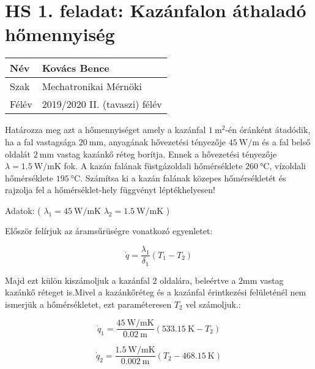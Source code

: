 
\section*{HS 1. feladat: Kazánfalon áthaladó hőmennyiség}


\begin{tabular}{ | p{2cm} | p{14cm} | } 
	\hline
	Név & Kovács Bence \\ 
	\hline
	Szak &  Mechatronikai Mérnöki\\
	\hline
	Félév & 2019/2020 II. (tavaszi) félév \\ 
	\hline
\end{tabular}
\vspace{0.5cm}

Határozza meg azt a hőmennyiséget amely a kazánfal $\SI{1}{\meter^2}$-én óránként átadódik, ha a fal vastagsága $\SI{20}{\milli\meter}$, anyagának hővezetési tényezője $\SI{45}{\watt\per\meter}$ és a fal belső oldalát $\SI{2}{\milli\meter}$ vastag kazánkő réteg borítja. Ennek a hővezetési tényezője $\lambda = \SI{1.5}{\watt\per\meter\K}$ fok. A kazán falának füstgázoldali hőmérséklete $\SI{260}{\celsius}$, vízoldali hőmérséklete $\SI{195}{\celsius}$. Számítsa ki a kazán falának közepes hőmérsékletét és rajzolja fel a hőmérséklet-hely függvényt léptékhelyesen!
    \vspace{1mm}

Adatok: ( $\lambda_1 = \SI{45}{\watt\per\meter\K}$
        $\lambda_2 = \SI{1.5}{\watt\per\meter\K}$ )
     \vspace{1mm}


Először felírjuk az áramsűrüségre vonatkozó egyenletet:

\begin{equation}
	 \dot{q} = \frac{\lambda_1}{\delta_1} (T_1 - T_2)
\end{equation}

Majd ezt külön kiszámoljuk a kazánfal 2 oldalára, beleértve a 2mm vastag kazánkő réteget is.Mivel a kazánkőréteg és a kazánfal érintkezési felületénél nem ismerjük a hőmérsékletet, ezt paraméteresen $T_2$ vel számoljuk.:

\begin{equation}
	 \dot{q}_1 = \frac{\SI{45}{\watt\per\meter\K}}{\SI{0.02}{\meter}} (\SI{533.15}{\kelvin} - T_2)
\end{equation}


\begin{equation}
	 \dot{q}_2 = \frac{\SI{1.5}{\watt\per\meter\K}}{\SI{0.002}{\meter}} (T_2 - \SI{468.15}{\kelvin})
\end{equation}


